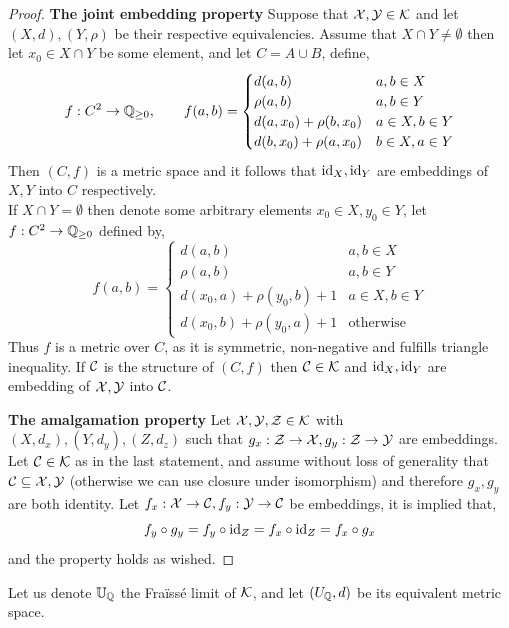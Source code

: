 \begin{proof}
	\textbf{The joint embedding property}\quad
	Suppose that $\mathcal{X}, \mathcal{Y} \in \mathcal{K}$ and let $(X, d), (Y, \rho)$ be their respective equivalencies.
	Assume that $X \cap Y \ne \emptyset$ then let $x_0 \in X \cap Y$ be some element, and let $C = A \cup B$, define,
	\[
		f : C^2 \to \mathbb{Q}_{\ge 0},
		\qquad
		f(a, b)
		= \begin{cases}
			d(a, b) & a, b \in X \\
			\rho(a, b) & a, b \in Y \\
			d(a, x_0) + \rho(b, x_0) & a \in X, b \in Y \\
			d(b, x_0) + \rho(a, x_0) & b \in X, a \in Y \\
		\end{cases}
	\]
	Then $(C, f)$ is a metric space and it follows that $\operatorname{id}_X, \operatorname{id}_Y$ are embeddings of $X, Y$ into $C$ respectively. \\
	If $X \cap Y = \emptyset$ then denote some arbitrary elements $x_0 \in X, y_0 \in Y$,
	let $f : C^2 \to \mathbb{Q}_{\ge 0}$ defined by,
	\[
		f(a, b)
		= \begin{cases}
			d(a, b) & a, b \in X \\
			\rho(a, b) & a, b \in Y \\
			d(x_0, a) + \rho(y_0, b) + 1 & a \in X, b \in Y \\
			d(x_0, b) + \rho(y_0, a) + 1 & \text{otherwise}
		\end{cases}
	\]
	Thus $f$ is a metric over $C$, as it is symmetric, non-negative and fulfills triangle inequality.
	If $\mathcal{C}$ is the structure of $(C, f)$ then $\mathcal{C} \in \mathcal{K}$ and $\operatorname{id}_X, \operatorname{id}_Y$ are embedding of $\mathcal{X}, \mathcal{Y}$ into $\mathcal{C}$.

	\textbf{The amalgamation property}\quad
	Let $\mathcal{X}, \mathcal{Y}, \mathcal{Z} \in \mathcal{K}$ with $(X, d_x), (Y, d_y), (Z, d_z)$ such that $g_x : \mathcal{Z} \to \mathcal{X}, g_y : \mathcal{Z} \to \mathcal{Y}$ are embeddings.
	Let $\mathcal{C} \in \mathcal{K}$ as in the last statement, and assume without loss of generality that $\mathcal{C} \subseteq \mathcal{X}, \mathcal{Y}$ (otherwise we can use closure under isomorphism) and therefore $g_x, g_y$ are both identity.
	Let $f_x : \mathcal{X} \to \mathcal{C}, f_y : \mathcal{Y} \to \mathcal{C}$ be embeddings, it is implied that,
	\[
		f_y \circ g_y
		= f_y \circ \operatorname{id}_Z
		= f_x \circ \operatorname{id}_Z
		= f_x \circ g_x
	\]
	and the property holds as wished.
\end{proof}
Let us denote $\mathbb{U}_{\mathbb{Q}}$ the Fraïssé limit of $\mathcal{K}$, and let $(U_{\mathbb{Q}}, d)$ be its equivalent metric space.

